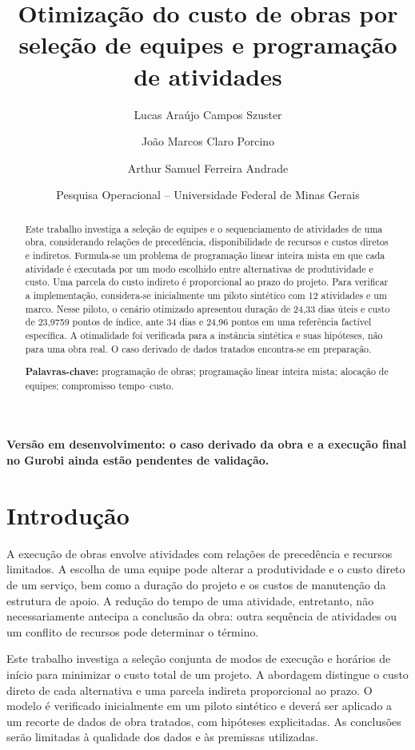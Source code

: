 \documentclass[12pt,a4paper]{article}
\title{Otimização do custo de obras por seleção de equipes e programação de atividades}
\author{Lucas Araújo Campos Szuster \and João Marcos Claro Porcino \and Arthur Samuel Ferreira Andrade}
\date{Pesquisa Operacional -- Universidade Federal de Minas Gerais}
\begin{document}
\maketitle

\begin{center}
\textbf{Versão em desenvolvimento: o caso derivado da obra e a execução final no Gurobi ainda estão pendentes de validação.}
\end{center}

\begin{abstract}
Este trabalho investiga a seleção de equipes e o sequenciamento de atividades de uma obra, considerando relações de precedência, disponibilidade de recursos e custos diretos e indiretos. Formula-se um problema de programação linear inteira mista em que cada atividade é executada por um modo escolhido entre alternativas de produtividade e custo. Uma parcela do custo indireto é proporcional ao prazo do projeto. Para verificar a implementação, considera-se inicialmente um piloto sintético com 12 atividades e um marco. Nesse piloto, o cenário otimizado apresentou duração de 24,33 dias úteis e custo de 23,9759 pontos de índice, ante 34 dias e 24,96 pontos em uma referência factível específica. A otimalidade foi verificada para a instância sintética e suas hipóteses, não para uma obra real. O caso derivado de dados tratados encontra-se em preparação.

\noindent\textbf{Palavras-chave:} programação de obras; programação linear inteira mista; alocação de equipes; compromisso tempo--custo.
\end{abstract}

\section{Introdução}
A execução de obras envolve atividades com relações de precedência e recursos limitados. A escolha de uma equipe pode alterar a produtividade e o custo direto de um serviço, bem como a duração do projeto e os custos de manutenção da estrutura de apoio. A redução do tempo de uma atividade, entretanto, não necessariamente antecipa a conclusão da obra: outra sequência de atividades ou um conflito de recursos pode determinar o término.

Este trabalho investiga a seleção conjunta de modos de execução e horários de início para minimizar o custo total de um projeto. A abordagem distingue o custo direto de cada alternativa e uma parcela indireta proporcional ao prazo. O modelo é verificado inicialmente em um piloto sintético e deverá ser aplicado a um recorte de dados de obra tratados, com hipóteses explicitadas. As conclusões serão limitadas à qualidade dos dados e às premissas utilizadas.
\end{document}
